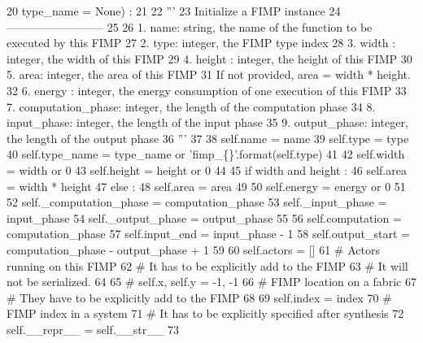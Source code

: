 \begin{DoxyCode}
20       type\_name = \textcolor{keywordtype}{None}) :
21 
22       \textcolor{stringliteral}{'''}
23 \textcolor{stringliteral}{        Initialize a FIMP instance}
24 \textcolor{stringliteral}{        --------------------------}
25 \textcolor{stringliteral}{}
26 \textcolor{stringliteral}{        1. name: string, the name of the function to be executed by this FIMP}
27 \textcolor{stringliteral}{        2. type: integer, the FIMP type index}
28 \textcolor{stringliteral}{        3. width : integer, the width of this FIMP}
29 \textcolor{stringliteral}{        4. height : integer, the height of this FIMP}
30 \textcolor{stringliteral}{        5. area: integer, the area of this FIMP}
31 \textcolor{stringliteral}{          If not provided, area = width * height.}
32 \textcolor{stringliteral}{        6. energy : integer, the energy consumption of one execution of this FIMP}
33 \textcolor{stringliteral}{        7. computation\_phase: integer, the length of the computation phase}
34 \textcolor{stringliteral}{        8. input\_phase: integer, the length of the input phase}
35 \textcolor{stringliteral}{        9. output\_phase: integer, the length of the output phase}
36 \textcolor{stringliteral}{      '''}
37 
38       self.name = name
39       self.type = type
40       self.type\_name = type\_name \textcolor{keywordflow}{or} \textcolor{stringliteral}{'fimp\_\{\}'}.format(self.type)
41 
42       self.width = width \textcolor{keywordflow}{or} 0
43       self.height = height \textcolor{keywordflow}{or} 0
44 
45       \textcolor{keywordflow}{if} width \textcolor{keywordflow}{and} height :
46         self.area = width * height
47       \textcolor{keywordflow}{else} :
48         self.area = area
49 
50       self.energy = energy \textcolor{keywordflow}{or} 0
51 
52       self.\_computation\_phase = computation\_phase
53       self.\_input\_phase = input\_phase
54       self.\_output\_phase = output\_phase
55 
56       self.computation = computation\_phase
57       self.input\_end = input\_phase - 1
58       self.output\_start = computation\_phase - output\_phase + 1
59 
60       self.actors = []
61       \textcolor{comment}{# Actors running on this FIMP}
62       \textcolor{comment}{# It has to be explicitly add to the FIMP}
63       \textcolor{comment}{# It will not be serialized.}
64 
65       \textcolor{comment}{# self.x, self.y = -1, -1}
66       \textcolor{comment}{# FIMP location on a fabric}
67       \textcolor{comment}{# They have to be explicitly add to the FIMP}
68 
69       self.index = index
70       \textcolor{comment}{# FIMP index in a system}
71       \textcolor{comment}{# It has to be explicitly specified after synthesis}
72       self.\_\_repr\_\_ = self.\_\_str\_\_
73 
\end{DoxyCode}


